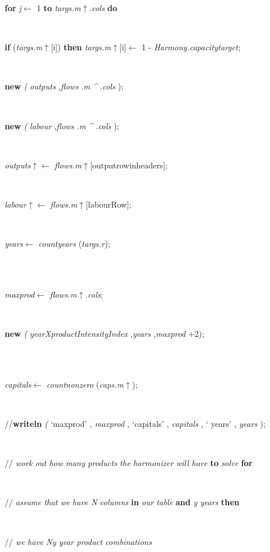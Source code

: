 \documentclass[10pt, a4paper]{article}
\begin{document}
\begin{tabbing}
\+\parbox{14cm}{\textsf {\textbf {for } \textsf{\textit{j}$\leftarrow$ 1} \textbf{ to } \textsf{\textit{targs.m}$\uparrow$.\textit{cols}} \textbf{ do } }}\\
\-\-\parbox{14cm}{\textsf {\textbf {if } \textsf{(\textit{targs.m}$\uparrow$\textit{}[i])} \textbf{ then } \textsf{\textit{targs.m}$\uparrow$\textit{}[i]$\leftarrow$ 1 - \textit{Harmony.capacitytarget}}; }}\\
\parbox{14cm}{\textsf{\textbf{new} \textit{(} \textit{outputs} ,\textit{flows} .\textit{m} \textit{\^{}} .\textit{cols} );}}\\
\parbox{14cm}{\textsf{\textbf{new} \textit{(} \textit{labour} ,\textit{flows} .\textit{m} \textit{\^{}} .\textit{cols} );}}\\
\parbox{14cm}{\textsf{\textit{outputs}$\uparrow$\textit{}$\leftarrow$ \textit{flows.m}$\uparrow$\textit{}[outputrowinheaders]}; }\\
\parbox{14cm}{\textsf{\textit{labour}$\uparrow$\textit{}$\leftarrow$ \textit{flows.m}$\uparrow$\textit{}[labourRow]}; }\\
\parbox{14cm}{\textsf{\textit{years}$\leftarrow$ \textit{countyears} (\textit{targs.r})}; }\\
\\
\parbox{14cm}{\textsf{\textit{maxprod}$\leftarrow$ \textit{flows.m}$\uparrow$.\textit{cols}}; }\\
\parbox{14cm}{\textsf{\textbf{new} \textit{(} \textit{yearXproductIntensityIndex} ,\textit{years} ,\textit{maxprod} +2);}}\\
\\
\parbox{14cm}{\textsf{\textit{capitals}$\leftarrow$ \textit{countnonzero} (\textit{caps.m}$\uparrow$\textit{})}; }\\
\parbox{14cm}{\textsf{//\textbf{writeln} \textit{(} \textrm{\textup { `maxprod' } }, \textit{maxprod} , \textrm{\textup { `capitals' } }, \textit{capitals} ,\textrm{\textup { ` years' } }, \textit{years} );}}\\
\parbox{14cm}{\textsf{// \textit{work}  \textit{out}  \textit{how}  \textit{many}  \textit{products}  \textit{the}  \textit{harmonizer}  \textit{will}  \textit{have}  \textbf{to}  \textit{solve}  \textbf{for} }}\\
\+\parbox{14cm}{\textsf{// \textit{assume}  \textit{that}  \textit{we}  \textit{have}  \textit{N}  \textit{columns}  \textbf{in}  \textit{our}  \textit{table}  \textbf{and}  \textit{y}  \textit{years}  \textbf{then} }}\\
\parbox{14cm}{\textsf{// \textit{we}  \textit{have}  \textit{Ny}  \textit{year}  \textit{product}  \textit{combinations} }}\\

\end{tabbing}
\end{document}
